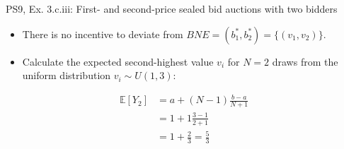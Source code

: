 \begin{frame}{PS9, Ex. 3.c.iii: First- and second-price sealed bid auctions with two bidders}
\begin{multicols}{2}
      \vspace{-18pt}
      \begin{itemize}
        \item[(ii)] There is no incentive to deviate from $BNE=(b_1^*,b_2^*)=\{(v_1,v_2)\}$.
        \item[(iii)] Calculate the expected second-highest value $v_i$ for $N=2$ draws from the uniform distribution $v_i\sim U(1,3)$:
      \end{itemize}
      \vspace{-8pt}
      \begin{align*}
        \mathbb{E}[Y_2]&=a+(N-1)\frac{b-a}{N+1}\\
                       &=1+1\frac{3-1}{2+1}\\
                       &=1+\frac{2}{3}=\frac{5}{3}
      \end{align*}
      \vfill\null
    \end{multicols}
\end{frame}
